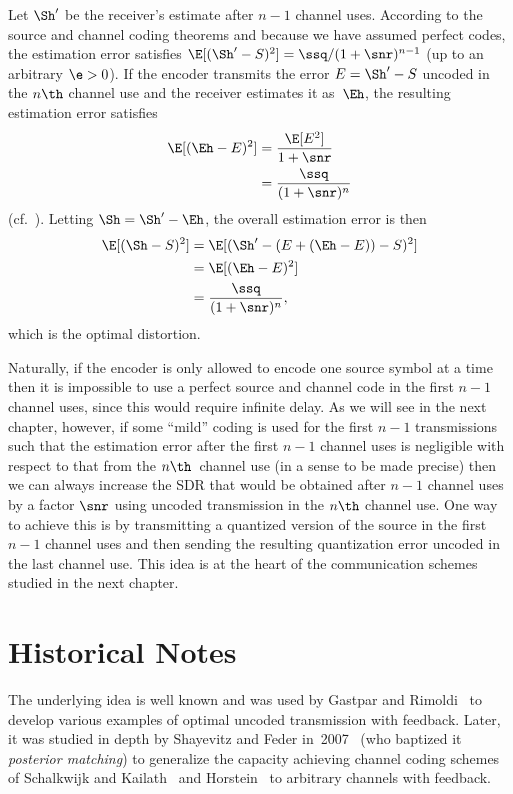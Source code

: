 Let $\Sh'$ be the receiver's estimate after $n-1$ channel uses. According to the
source and channel coding theorems and because we have assumed perfect codes,
the estimation error satisfies $\E[(\Sh' - S)^2] = \ssq / (1 + \snr)^{n-1}$ (up
to an arbitrary $\e > 0$). If the encoder transmits the error $E = \Sh' - S$
uncoded in the $n\th$ channel use and the receiver estimates it as~$\Eh$, the
resulting estimation error satisfies
\begin{align*}
  \E[(\Eh - E)^2] &= \frac{\E[E^2]}{ 1 + \snr } \\
  &= \frac{\ssq}{(1 + \snr)^n}
\end{align*}
(cf.~).
Letting $\Sh = \Sh' - \Eh$, the overall estimation error is then 
\begin{align*}
  \E[(\Sh - S)^2] &= \E[(\Sh' - (E + (\Eh - E)) - S)^2] \\
  &= \E[(\Eh - E)^2] \\
  &= \frac{\ssq}{(1 + \snr)^n},
\end{align*}
which is the optimal distortion. 

Naturally, if the encoder is only allowed to encode one source symbol at a time
then it is impossible to use a perfect source and channel code in the first
$n-1$ channel uses, since this would require infinite delay. As we will see in
the next chapter, however, if some ``mild'' coding is used for the first $n-1$
transmissions such that the estimation error after the first $n-1$ channel uses
is negligible with respect to that from the $n\th$~channel use (in a sense to be
made precise) then we can always increase the SDR that would be obtained after
$n-1$ channel uses by a factor $\snr$ using uncoded transmission in the $n\th$
channel use. One way to achieve this is by transmitting a quantized version of
the source in the first $n-1$ channel uses and then sending the resulting
quantization error uncoded in the last channel use. This idea is at the heart of
the communication schemes studied in the next chapter.


\section{Historical Notes}

The underlying idea is well known and was used by Gastpar and
Rimoldi~\cite{GastparR2003} to develop various examples of optimal uncoded
transmission with feedback.  Later, it was studied in depth by Shayevitz and
Feder in~2007~\cite{ShayevitzF2007,ShayevitzF2008} (who baptized it
\emph{posterior matching}) to generalize the capacity achieving channel coding
schemes of Schalkwijk and Kailath~\cite{SchalkwijkK1966} and
Horstein~\cite{Horstein1963} to arbitrary channels with feedback.



